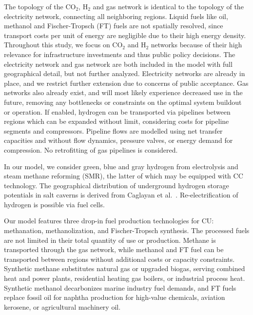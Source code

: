 \documentclass[twocolumn]{article}
\newcommand{\COtwo}{CO$_2$}
\newcommand{\Htwo}{H$_2$}
\begin{document}

The topology of the \COtwo{}, \Htwo{} and gas network is identical to the topology of the electricity network, connecting all neighboring regions. Liquid fuels like oil, methanol and Fischer-Tropsch (FT) fuels are not spatially resolved, since transport costs per unit of energy are negligible due to their high energy density. Throughout this study, we focus on \COtwo{} and \Htwo{} networks because of their high relevance for infrastructure investments and thus public policy decisions. The electricity network and gas network are both included in the model with full geographical detail, but not further analyzed. Electricity networks are already in place, and we restrict further extension due to concerns of public acceptance. Gas networks also already exist, and will most likely experience decreased use in the future, removing any bottlenecks or constraints on the optimal system buildout or operation.
If enabled, hydrogen can be transported via pipelines between regions which can be expanded without limit, considering costs for pipeline segments and compressors. Pipeline flows are modelled using net transfer capacities and without flow dynamics, pressure valves, or energy demand for compression. No retrofitting of gas pipelines is considered.


In our model, we consider green, blue and gray hydrogen from electrolysis and steam methane reforming (SMR), the latter of which may be equipped with CC technology. The geographical distribution of underground hydrogen storage potentials in salt caverns is derived from Caglayan et al.~\cite{caglayanTechnicalPotentialSalt2020}. Re-electrification of hydrogen is possible via fuel cells. 



Our model features three drop-in fuel production technologies for CU: methanation, methanolization, and Fischer-Tropsch synthesis.
The processed fuels are not limited in their total quantity of use or production.
Methane is transported through the gas network, while methanol and FT fuel can be transported between regions without additional costs or capacity constraints.
Synthetic methane substitutes natural gas or upgraded biogas, serving combined heat and power plants, residential heating gas boilers, or industrial process heat.
Synthetic methanol decarbonizes marine industry fuel demands, and FT fuels replace fossil oil for naphtha production for high-value chemicals, aviation kerosene, or agricultural machinery oil.
\end{document}
